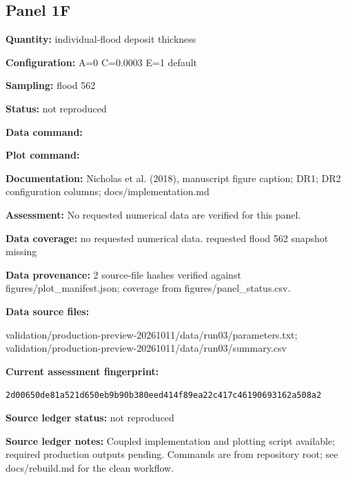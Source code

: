 \subsection*{Panel 1F}
\textbf{Quantity:} individual-flood deposit thickness

\textbf{Configuration:} A=0 C=0.0003 E=1 default

\textbf{Sampling:} flood 562

\textbf{Status:} not reproduced

\textbf{Data command:}\par {\small \texttt{}}\par

\textbf{Plot command:}\par {\small \texttt{}}\par

\textbf{Documentation:} Nicholas et al. (2018), manuscript figure caption; DR1; DR2 configuration columns; docs/\allowbreak{}implementation.md

\textbf{Assessment:} No requested numerical data are verified for this panel.

\textbf{Data coverage:} no requested numerical data. requested flood 562 snapshot missing

\textbf{Data provenance:} 2 source-file hashes verified against figures/\allowbreak{}plot\_\allowbreak{}manifest.json; coverage from figures/\allowbreak{}panel\_\allowbreak{}status.csv.

\textbf{Data source files:}\par {\small\raggedright validation/\allowbreak{}production-preview-20261011/\allowbreak{}data/\allowbreak{}run03/\allowbreak{}parameters.txt; validation/\allowbreak{}production-preview-20261011/\allowbreak{}data/\allowbreak{}run03/\allowbreak{}summary.csv\par}

\textbf{Current assessment fingerprint:}\par {\small\texttt{2d00650de81a521d650eb9b90b380eed414f89ea22c417c46190693162a508a2}}\par

\textbf{Source ledger status:} not reproduced

\textbf{Source ledger notes:} Coupled implementation and plotting script available; required production outputs pending. Commands are from repository root; see docs/\allowbreak{}rebuild.md for the clean workflow.

